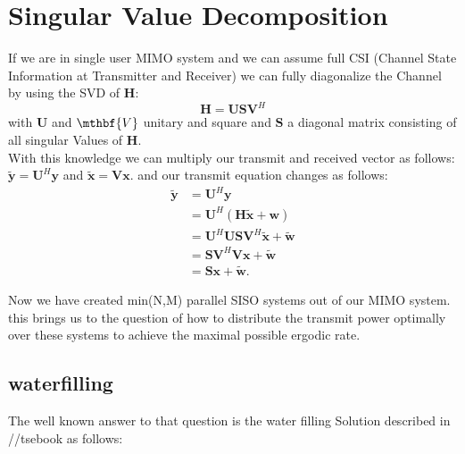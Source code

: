 \section{Singular Value Decomposition}
If we are in single user MIMO system and we can assume full CSI (Channel State Information at Transmitter and Receiver) we can fully diagonalize the Channel by using the SVD of $\mathbf{H}$:
\begin{equation}
	\mathbf{H} = \mathbf{USV}^H
\end{equation}
with $\mathbf{U}$ and $\mthbf{V}$ unitary and square and $\mathbf{S}$ a diagonal matrix consisting of all singular Values of $\mathbf{H}$.\\
With this knowledge we can multiply our transmit and received vector as follows: $\mathbf{\tilde{y}} = \mathbf{U}^H\mathbf{y} $ and $ \mathbf{\tilde{x}} = \mathbf{Vx}$. and our transmit equation changes as follows: 
\begin{align}
	\mathbf{\tilde{y}} &= \mathbf{U}^H\mathbf{y} \\
	& = \mathbf{U}^H(\mathbf{H\tilde{x} + w}) \\
	& = \mathbf{U}^H\mathbf{USV}^H\mathbf{\tilde{x}+\tilde{w}}\\
	& = \mathbf{SV}^H\mathbf{Vx}+\mathbf{\tilde{w}}\\
	&= \mathbf{Sx + \tilde{w}}.
\end{align}

Now we have created min(N,M) parallel SISO systems out of our MIMO system. this brings us to the question of how to distribute the transmit power optimally over these systems to achieve the maximal possible ergodic rate.
\subsection{waterfilling}
The well known answer to that question is the water filling Solution described in //tsebook as follows:
